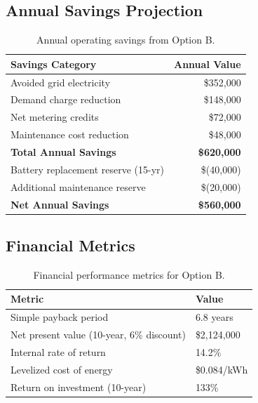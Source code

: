 \documentclass[
    language=english,
    doctype=feasibility-study,
    institution=none,
]{../../omnilatex}
\begin{document}
\subsection{Annual Savings Projection}

\begin{table}[h]
    \centering
    \begin{tabular}{lr}
        \toprule
        \textbf{Savings Category} & \textbf{Annual Value} \\
        \midrule
        Avoided grid electricity & \$352,000 \\
        Demand charge reduction & \$148,000 \\
        Net metering credits & \$72,000 \\
        Maintenance cost reduction & \$48,000 \\
        \midrule
        \textbf{Total Annual Savings} & \textbf{\$620,000} \\
        \midrule
        Battery replacement reserve (15-yr) & \$(40,000) \\
        Additional maintenance reserve & \$(20,000) \\
        \midrule
        \textbf{Net Annual Savings} & \textbf{\$560,000} \\
        \bottomrule
    \end{tabular}
    \caption{Annual operating savings from Option B.}
\end{table}

\subsection{Financial Metrics}

\begin{table}[h]
    \centering
    \begin{tabular}{ll}
        \toprule
        \textbf{Metric} & \textbf{Value} \\
        \midrule
        Simple payback period & 6.8 years \\
        Net present value (10-year, 6\% discount) & \$2,124,000 \\
        Internal rate of return & 14.2\% \\
        Levelized cost of energy & \$0.084/kWh \\
        Return on investment (10-year) & 133\% \\
        \bottomrule
    \end{tabular}
    \caption{Financial performance metrics for Option B.}
\end{table}
\end{document}
